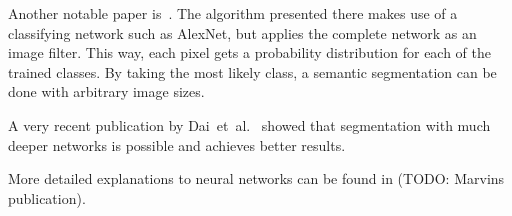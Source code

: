 Another notable paper is~\cite{long2014fully}. The algorithm presented there
makes use of a classifying network such as AlexNet, but applies the complete
network as an image filter. This way, each pixel gets a probability
distribution for each of the trained classes. By taking the most likely class,
a semantic segmentation can be done with arbitrary image sizes.

A very recent publication by Dai~et~al.~\cite{dai2015instance} showed that
segmentation with much deeper networks is possible and achieves better results.

More detailed explanations to neural networks can be found in (TODO: Marvins
publication).
